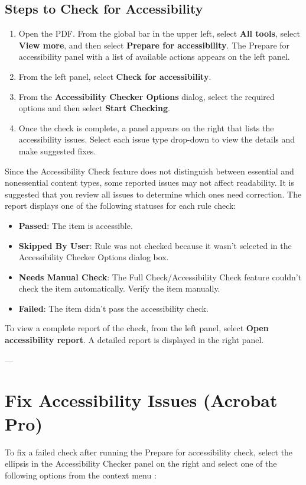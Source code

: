 \subsection{Steps to Check for Accessibility}
\label{subsec:acrobat-steps-check}

\begin{enumerate}
    \item Open the PDF. From the global bar in the upper left, select \textbf{All tools}, select \textbf{View more}, and then select \textbf{Prepare for accessibility}. The Prepare for accessibility panel with a list of available actions appears on the left panel.
    \item From the left panel, select \textbf{Check for accessibility}.
    \item From the \textbf{Accessibility Checker Options} dialog, select the required options and then select \textbf{Start Checking}.
    \item Once the check is complete, a panel appears on the right that lists the accessibility issues. Select each issue type drop-down to view the details and make suggested fixes.
\end{enumerate}


Since the Accessibility Check feature does not distinguish between essential and nonessential content types, some reported issues may not affect readability. It is suggested that you review all issues to determine which ones need correction. The report displays one of the following statuses for each rule check\footnotemark[1]:

\begin{itemize}
    \item \textbf{Passed}: The item is accessible.
    \item \textbf{Skipped By User}: Rule was not checked because it wasn't selected in the Accessibility Checker Options dialog box.
    \item \textbf{Needs Manual Check}: The Full Check/Accessibility Check feature couldn't check the item automatically. Verify the item manually.
    \item \textbf{Failed}: The item didn't pass the accessibility check.
\end{itemize}

To view a complete report of the check, from the left panel, select \textbf{Open accessibility report}. A detailed report is displayed in the right panel.


---


\section{Fix Accessibility Issues (Acrobat Pro)}
\label{sec:acrobat-fix-accessibility}
To fix a failed check after running the Prepare for accessibility check, select the ellipsis in the Accessibility Checker panel on the right and select one of the following options from the context menu \cite{AdobeHelpX}:

